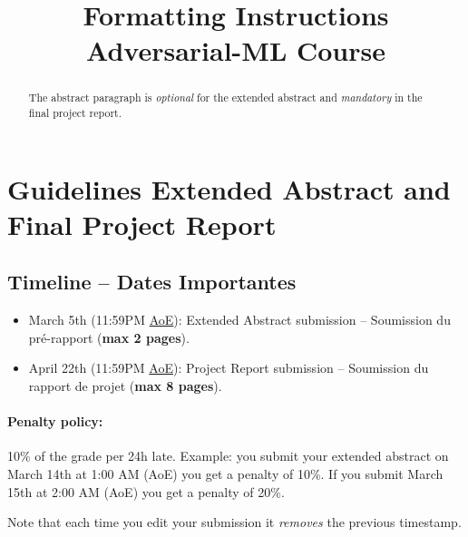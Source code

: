 \documentclass{article}
\title{Formatting Instructions Adversarial-ML Course}
\begin{document}
\maketitle

\begin{abstract}
  The abstract paragraph is \emph{optional} for the extended abstract and \emph{mandatory} in the final project report.
\end{abstract}

\section{Guidelines Extended Abstract and Final Project Report}

\subsection{Timeline -- Dates Importantes}
\begin{itemize}
    \item March 5th (11:59PM \href{https://www.timeanddate.com/time/zones/aoe}{AoE}): Extended Abstract submission -- Soumission du pré-rapport (\textbf{max 2 pages}).
    \item April 22th (11:59PM \href{https://www.timeanddate.com/time/zones/aoe}{AoE}): Project Report submission -- Soumission du rapport de projet (\textbf{max 8 pages}).
\end{itemize}

\paragraph{Penalty policy:} 10\% of the grade per 24h late. Example: you submit your extended abstract on March 14th at 1:00 AM (AoE) you get a penalty of 10\%. If you submit March 15th at 2:00 AM (AoE) you get a penalty of 20\%.

Note that each time you edit your submission it \emph{removes} the previous timestamp. 
\end{document}

